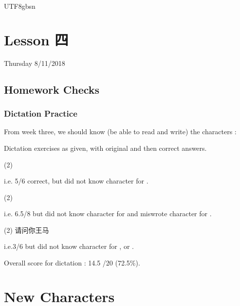 \documentclass{article}
\newcommand{\myfont}{gbsn} %
\begin{document}
 
\begin{CJK}{UTF8}{\myfont} 
\section{Lesson 四}

Thursday 8/11/2018

\subsection{Homework Checks}

\subsubsection{Dictation Practice}

From week three, we should know (be able to read and write) the characters :

Dictation exercises as given, with original and then correct answers.

\begin{question}
  \begin{tasks}(2)
  \end{tasks}
\end{question}

i.e. 5/6 correct, but did not know character for .

\begin{question}
  \begin{tasks}(2)
  \end{tasks}
\end{question}

i.e. 6.5/8 but did not know character for  and miswrote character for .

\begin{question}
  \begin{tasks}(2)
  \task 请问你王马
  \end{tasks}
\end{question}

i.e.3/6 but did not know character for ,  or .

Overall score for dictation : 14.5 /20 (72.5\%).

\section{New Characters}


\end{CJK}
\end{document}
